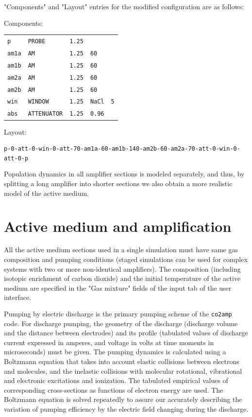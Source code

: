 \documentclass{report}
\begin{document}
"Components" and "Layout" entries for the modified configuration are as follows:

\bigskip
Components:\nopagebreak

\bigskip
\begin{tabular}{lllll}
\texttt{p}    & \texttt{PROBE}      & \texttt{1.25} &               &           \\
\texttt{am1a} & \texttt{AM}         & \texttt{1.25} & \texttt{60}   &           \\
\texttt{am1b} & \texttt{AM}         & \texttt{1.25} & \texttt{60}   &           \\
\texttt{am2a} & \texttt{AM}         & \texttt{1.25} & \texttt{60}   &           \\
\texttt{am2b} & \texttt{AM}         & \texttt{1.25} & \texttt{60}   &           \\
\texttt{win}  & \texttt{WINDOW}     & \texttt{1.25} & \texttt{NaCl} & \texttt{5}\\
\texttt{abs}  & \texttt{ATTENUATOR} & \texttt{1.25} & \texttt{0.96} &
\end{tabular}
\bigskip

Layout:\nopagebreak

\bigskip
\texttt{p-0-att-0-win-0-att-70-am1a-60-am1b-140-am2b-60-am2a-70-att-0-win-0-att-0-p}
\bigskip

Population dynamics in all amplifier sections is modeled separately, and thus, by splitting a long amplifier into shorter sections we also obtain a more realistic model of the active medium.


\section{Active medium and amplification}
All the active medium sections used in a single simulation must have same gas composition and pumping conditions (staged simulations can be used for complex systems with two or more non-identical amplifiers). The composition (including isotopic enrichment of carbon dioxide) and the initial temperature of the active medium are specified in the "Gas mixture" fields of the input tab of the user interface.

Pumping by electric discharge is the primary pumping scheme of the \texttt{co2amp} code. For discharge pumping, the geometry of the discharge (discharge volume and the distance between electrodes) and its profile (tabulated values of discharge current expressed in amperes, and voltage in volts at time moments in microseconds) must be given. The pumping dynamics is calculated using a Boltzmann equation that takes into account elastic collisions between electrons and molecules, and the inelastic collisions with molecular rotational, vibrational and electronic excitations and ionization. The tabulated empirical values of corresponding cross-sections as functions of electron energy are used. The Boltzmann equation is solved repeatedly to assure our accurately describing  the variation of pumping efficiency by the electric field changing during the discharge.
\end{document}
